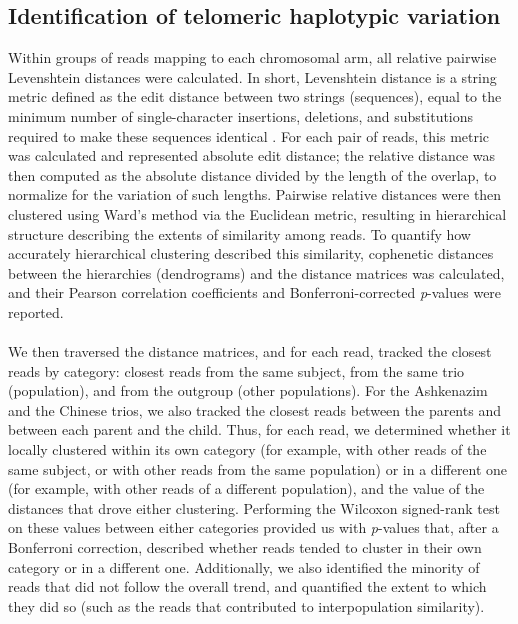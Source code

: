 \documentclass{article}
\begin{document}
\subsection*{Identification of telomeric haplotypic variation}
    Within groups of reads mapping to each chromosomal arm, all relative pairwise Levenshtein distances were calculated.
    In short, Levenshtein distance is a string metric defined as the edit distance between two strings (sequences),
        equal to the minimum number of single-character insertions, deletions, and substitutions
            required to make these sequences identical \parencite{levenshtein}.
    For each pair of reads, this metric was calculated and represented absolute edit distance;
        the relative distance was then computed as the absolute distance divided by the length of the overlap,
            to normalize for the variation of such lengths.
    Pairwise relative distances were then clustered using Ward's method via the Euclidean metric,
        resulting in hierarchical structure describing the extents of similarity among reads.
    To quantify how accurately hierarchical clustering described this similarity,
        cophenetic distances \parencite{cophenetic} between the hierarchies (dendrograms) and the distance matrices was calculated,
        and their Pearson correlation coefficients and Bonferroni-corrected \textit{p}-values were reported.
    \\~\\
    We then traversed the distance matrices,
        and for each read, tracked the closest reads by category:
            closest reads from the same subject,
            from the same trio (population),
            and from the outgroup (other populations).
        For the Ashkenazim and the Chinese trios, we also tracked the closest reads
            between the parents
            and between each parent and the child.
        Thus, for each read, we determined whether it locally clustered
            within its own category
                (for example, with other reads of the same subject, or with other reads from the same population)
            or in a different one
                (for example, with other reads of a different population),
            and the value of the distances that drove either clustering.
        Performing the Wilcoxon signed-rank test on these values between either categories
            provided us with \textit{p}-values that, after a Bonferroni correction,
            described whether reads tended to cluster in their own category or in a different one.
        Additionally, we also identified the minority of reads that did not follow the overall trend,
            and quantified the extent to which they did so
                (such as the reads that contributed to interpopulation similarity).
\end{document}
